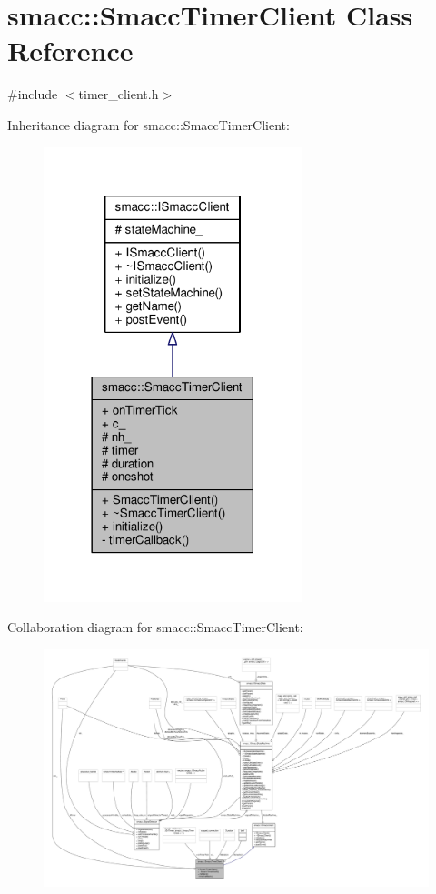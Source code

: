 \hypertarget{classsmacc_1_1SmaccTimerClient}{}\section{smacc\+:\+:Smacc\+Timer\+Client Class Reference}
\label{classsmacc_1_1SmaccTimerClient}


{\ttfamily \#include $<$timer\+\_\+client.\+h$>$}



Inheritance diagram for smacc\+:\+:Smacc\+Timer\+Client\+:
\nopagebreak
\begin{figure}[H]
\begin{center}
\leavevmode
\includegraphics[width=213pt]{classsmacc_1_1SmaccTimerClient__inherit__graph}
\end{center}
\end{figure}


Collaboration diagram for smacc\+:\+:Smacc\+Timer\+Client\+:
\nopagebreak
\begin{figure}[H]
\begin{center}
\leavevmode
\includegraphics[width=350pt]{classsmacc_1_1SmaccTimerClient__coll__graph}
\end{center}
\end{figure}
